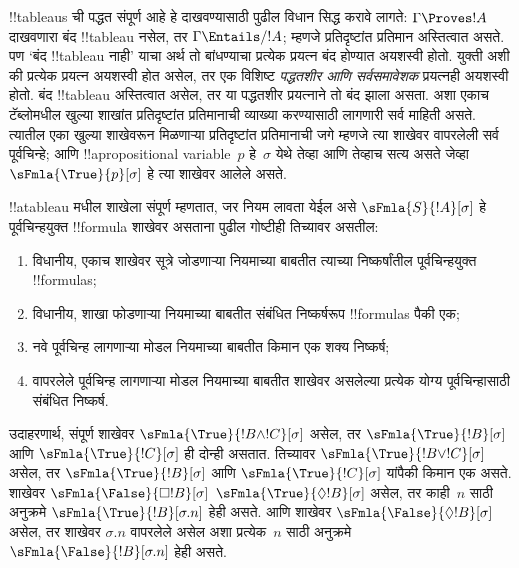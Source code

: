 \documentclass[../../../include/open-logic-section]{subfiles}
\begin{document}


\begin{explain}
  !!{tableau}s ची पद्धत संपूर्ण आहे हे
  दाखवण्यासाठी पुढील विधान सिद्ध करावे लागते:
  $\Gamma \Proves !A$ दाखवणारा बंद !!{tableau}
  नसेल, तर $\Gamma \Entails/ !A$; म्हणजे
  प्रतिदृष्टांत प्रतिमान अस्तित्वात असते.
  पण ‘बंद !!{tableau} नाही’ याचा अर्थ
  तो बांधण्याचा प्रत्येक प्रयत्न बंद होण्यात
  अयशस्वी होतो. युक्ती अशी की प्रत्येक प्रयत्न
  अयशस्वी होत असेल, तर एक विशिष्ट
  \emph{पद्धतशीर आणि सर्वसमावेशक} प्रयत्नही
  अयशस्वी होतो. बंद !!{tableau} अस्तित्वात
  असेल, तर या पद्धतशीर प्रयत्नाने तो बंद
  झाला असता. अशा एकाच टॅब्लोमधील खुल्या
  शाखांत प्रतिदृष्टांत प्रतिमानाची व्याख्या
  करण्यासाठी लागणारी सर्व माहिती असते.
  त्यातील एका खुल्या शाखेवरून मिळणाऱ्या
  प्रतिदृष्टांत प्रतिमानाची जगे म्हणजे त्या
  शाखेवर वापरलेली सर्व पूर्वचिन्हे; आणि
  !!a{propositional
    variable}~$p$ हे~$\sigma$ येथे
  तेव्हा आणि तेव्हाच सत्य असते जेव्हा
  $\sFmla{\True}{p}[\sigma]$ हे त्या
  शाखेवर आलेले असते.
\end{explain}

\begin{defn}
  !!a{tableau} मधील शाखेला संपूर्ण
  म्हणतात, जर नियम लावता येईल असे
  $\sFmla{S}{!A}[\sigma]$ हे पूर्वचिन्हयुक्त
  !!{formula} शाखेवर असताना पुढील गोष्टीही
  तिच्यावर असतील:
  \begin{enumerate}
    \item विधानीय, एकाच शाखेवर सूत्रे जोडणाऱ्या
      नियमाच्या बाबतीत त्याच्या निष्कर्षांतील
      पूर्वचिन्हयुक्त !!{formula}s;
    \item विधानीय, शाखा फोडणाऱ्या नियमाच्या
      बाबतीत संबंधित निष्कर्षरूप
      !!{formula}s पैकी एक;
    \item नवे पूर्वचिन्ह लागणाऱ्या मोडल नियमाच्या
      बाबतीत किमान एक शक्य निष्कर्ष;
    \item वापरलेले पूर्वचिन्ह लागणाऱ्या मोडल
      नियमाच्या बाबतीत शाखेवर असलेल्या
      प्रत्येक योग्य पूर्वचिन्हासाठी संबंधित
      निष्कर्ष.
  \end{enumerate}
\end{defn}

\begin{explain}
उदाहरणार्थ, संपूर्ण शाखेवर
$\sFmla{\True}{!B \land !C}[\sigma]$
असेल, तर $\sFmla{\True}{!B}[\sigma]$
आणि $\sFmla{\True}{!C}[\sigma]$
ही दोन्ही असतात. तिच्यावर
$\sFmla{\True}{!B \lor !C}[\sigma]$
असेल, तर $\sFmla{\True}{!B}[\sigma]$
आणि $\sFmla{\True}{!C}[\sigma]$
यांपैकी किमान एक असते.
शाखेवर 
{$\sFmla{\False}{\Box !B}[\sigma]$}
{$\sFmla{\True}{\Diamond !B}[\sigma]$}
असेल, तर काही~$n$ साठी अनुक्रमे
{$\sFmla{\True}{!B}[\sigma.n]$}
हेही असते. आणि शाखेवर
{$\sFmla{\False}{\Diamond !B}[\sigma]$}
असेल, तर शाखेवर $\sigma.n$ वापरलेले
असेल अशा प्रत्येक~$n$ साठी अनुक्रमे
{$\sFmla{\False}{!B}[\sigma.n]$}
हेही असते.
\end{explain}
\end{document}
